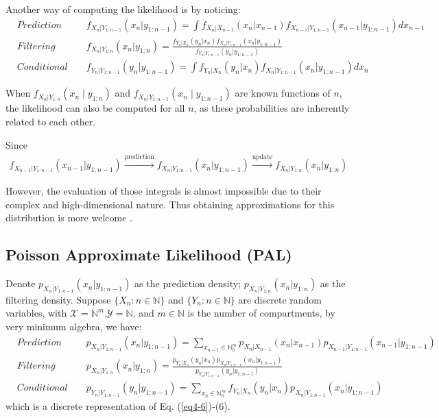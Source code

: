 \documentclass[10pt]{article}
\begin{document}
\vspace{3mm}
Another way of computing the likelihood is by noticing: 
\vspace{-3mm}
\begin{align}\label{eq4-6}
&\textit{Prediction Formula: }     &&f_{X_n|Y_{1:n-1}}(x_n|y_{1:n-1})=\int f_{X_n|X_{n-1}}(x_n|x_{n-1})f_{X_{n-1}|Y_{1:n-1}}(x_{n-1}|y_{1:n-1})dx_{n-1}\\
&\textit{Filtering Formula: } &&f_{X_n|Y_{1:n}}(x_n|y_{1:n})=\frac{f_{Y_n|X_n}(y_n|x_n)f_{X_n|Y_{1:n-1}}(x_n|y_{1:n-1})}{f_{Y_n|Y_{1:n-1}}(y_n|y_{1:n-1})} \\
&\textit{Conditional Likelihood: } &&f_{Y_n|Y_{1:n-1}}(y_n|y_{1:n-1}) =\int f_{Y_n|X_n}(y_n|x_n)f_{X_n|Y_{1:n-1}}(x_n|y_{1:n-1})d{x_n}
\end{align}




When $f_{X_n|Y_{1:n}}(x_n \mid y_{1:n})$ and $f_{X_n|Y_{1:n-1}}(x_n \mid y_{1:n-1})$ are known functions of $n$, the likelihood can also be computed for all $n$, as these probabilities are inherently related to each other. 

Since
\vspace{-3mm}
\begin{align*}
    f_{X_{n-1}|Y_{1:n-1}}(x_{n-1}|y_{1:n-1}) \xrightarrow{\text{prediction}} f_{X_n|Y_{1:n-1}}(x_n|y_{1:n-1}) \xrightarrow{\text{update}} f_{X_n|Y_{1:n}}(x_{n}|y_{1:n}) 
\end{align*}



However, the evaluation of those integrals is almost impossible due to their complex and high-dimensional nature. Thus obtaining approximations for this distribution is more welcome \citep{Doucet}. 

\subsection{Poisson Approximate Likelihood (PAL)}

Denote $p_{X_n|Y_{1:n-1}}(x_n|y_{1:n-1})$ as the prediction density; $p_{X_n|Y_{1:n}}(x_n|y_{1:n})$ as the filtering density. Suppose $\{X_n: n\in \mathds{N}\}$ and $\{Y_n: n\in \mathds{N}\}$ are discrete random variables, with $\mathcal{X}=\mathds{N}^m$,$\mathcal{Y}=\mathds{N}$, and $m \in \mathds{N}$ is the number of compartments, by very minimum algebra, we have:
\vspace{-3mm}
\begin{align*}
&\textit{Prediction Formula: }     &&p_{X_n|Y_{1:n-1}}(x_n|y_{1:n-1})=\sum_{x_{n-1}\in \mathds{N}_0^m}p_{X_n|X_{n-1}}(x_n|x_{n-1})p_{X_{n-1}|Y_{1:n-1}}(x_{n-1}|y_{1:n-1}) \\
&\textit{Filtering Formula: } &&p_{X_n|Y_{1:n}}(x_n|y_{1:n})=\frac{p_{Y_n|X_n}(y_n|x_n)p_{X_n|Y_{1:n-1}}(x_n|y_{1:n-1})}{p_{Y_n|Y_{1:n-1}}(y_n|y_{1:n-1})} \\
&\textit{Conditional Likelihood: } &&p_{Y_n|Y_{1:n-1}}(y_n|y_{1:n-1}) =\sum_{x_n\in \mathds{N}_0^m}f_{Y_n|X_n}(y_n|x_n)p_{X_n|Y_{1:n-1}}(x_n|y_{1:n-1})
\end{align*}
which is a discrete representation of Eq. (\ref{eq4-6})-(6).
\end{document}
